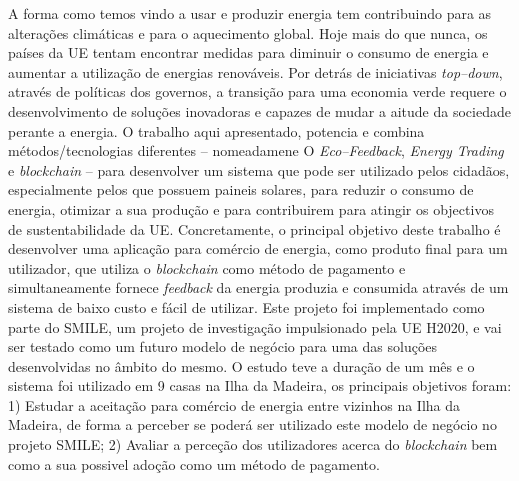 \noindent 
A forma como temos vindo a usar e produzir energia tem contribuindo para as alterações climáticas e para o aquecimento global. 
Hoje mais do que nunca, os países da \ac{UE} tentam encontrar medidas para diminuir o consumo de energia e aumentar a utilização de energias renováveis. Por detrás de iniciativas \textit{top--down}, através de políticas dos governos, a transição para uma economia verde requere o desenvolvimento de soluções inovadoras e capazes de mudar a aitude da sociedade perante a energia. O trabalho aqui apresentado, potencia e combina métodos/tecnologias diferentes -- nomeadamene O \textit{Eco--Feedback}, \textit{Energy Trading} e  \textit{blockchain} -- para desenvolver um sistema que pode ser utilizado pelos cidadãos, especialmente pelos que possuem paineis solares, para reduzir o consumo de energia, otimizar a sua produção e para contribuirem para atingir os objectivos de sustentabilidade da \ac{UE}. 
Concretamente, o principal objetivo deste trabalho é desenvolver uma aplicação para comércio de energia, como produto final para um utilizador, que utiliza o \textit{blockchain} como método de pagamento e simultaneamente fornece \textit{feedback} da energia produzia e consumida através de um sistema de baixo custo e fácil de utilizar.
Este projeto foi implementado como parte do \ac{SMILE}, um projeto de investigação impulsionado pela \ac{UE} H2020, e vai ser testado como um futuro modelo de negócio para uma das soluções desenvolvidas no âmbito do mesmo. 
O estudo teve a duração de um mês e o sistema foi utilizado em 9 casas na Ilha da Madeira, os principais objetivos foram: 1) Estudar a aceitação para comércio de energia entre vizinhos na Ilha da Madeira, de forma a perceber se poderá ser utilizado este modelo de negócio no projeto \ac{SMILE}; 2) Avaliar a perceção dos utilizadores acerca do \textit{blockchain} bem como a sua possivel adoção como um método de pagamento. 
